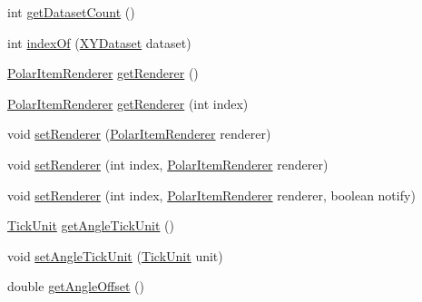 \begin{DoxyCompactItemize}
\item 
int \mbox{\hyperlink{classorg_1_1jfree_1_1chart_1_1plot_1_1_polar_plot_a02749336dcc9281dc6bd2af61145f5af}{get\+Dataset\+Count}} ()
\item 
int \mbox{\hyperlink{classorg_1_1jfree_1_1chart_1_1plot_1_1_polar_plot_ad76d83b6179eed10de0c216bbbd6437e}{index\+Of}} (\mbox{\hyperlink{interfaceorg_1_1jfree_1_1data_1_1xy_1_1_x_y_dataset}{X\+Y\+Dataset}} dataset)
\item 
\mbox{\hyperlink{interfaceorg_1_1jfree_1_1chart_1_1renderer_1_1_polar_item_renderer}{Polar\+Item\+Renderer}} \mbox{\hyperlink{classorg_1_1jfree_1_1chart_1_1plot_1_1_polar_plot_a49334753a560393d54d2d988577bd23c}{get\+Renderer}} ()
\item 
\mbox{\hyperlink{interfaceorg_1_1jfree_1_1chart_1_1renderer_1_1_polar_item_renderer}{Polar\+Item\+Renderer}} \mbox{\hyperlink{classorg_1_1jfree_1_1chart_1_1plot_1_1_polar_plot_afad236333ed9dff60408dc1827779646}{get\+Renderer}} (int index)
\item 
void \mbox{\hyperlink{classorg_1_1jfree_1_1chart_1_1plot_1_1_polar_plot_a0f5968ac9a7b8c8bff650d6e50881135}{set\+Renderer}} (\mbox{\hyperlink{interfaceorg_1_1jfree_1_1chart_1_1renderer_1_1_polar_item_renderer}{Polar\+Item\+Renderer}} renderer)
\item 
void \mbox{\hyperlink{classorg_1_1jfree_1_1chart_1_1plot_1_1_polar_plot_a3385d278068d3cf8773bda485a7ddb68}{set\+Renderer}} (int index, \mbox{\hyperlink{interfaceorg_1_1jfree_1_1chart_1_1renderer_1_1_polar_item_renderer}{Polar\+Item\+Renderer}} renderer)
\item 
void \mbox{\hyperlink{classorg_1_1jfree_1_1chart_1_1plot_1_1_polar_plot_a6e02f16d0266c4d0a68538564712c76a}{set\+Renderer}} (int index, \mbox{\hyperlink{interfaceorg_1_1jfree_1_1chart_1_1renderer_1_1_polar_item_renderer}{Polar\+Item\+Renderer}} renderer, boolean notify)
\item 
\mbox{\hyperlink{classorg_1_1jfree_1_1chart_1_1axis_1_1_tick_unit}{Tick\+Unit}} \mbox{\hyperlink{classorg_1_1jfree_1_1chart_1_1plot_1_1_polar_plot_ac1d209b7e5ba1bb53c529f7bdb59b501}{get\+Angle\+Tick\+Unit}} ()
\item 
void \mbox{\hyperlink{classorg_1_1jfree_1_1chart_1_1plot_1_1_polar_plot_adc9661a3cd1aa24c986f5e4fdadd6e3a}{set\+Angle\+Tick\+Unit}} (\mbox{\hyperlink{classorg_1_1jfree_1_1chart_1_1axis_1_1_tick_unit}{Tick\+Unit}} unit)
\item 
double \mbox{\hyperlink{classorg_1_1jfree_1_1chart_1_1plot_1_1_polar_plot_abb7d874d8406ec1fe25a27d5ead0cd34}{get\+Angle\+Offset}} ()

\end{DoxyCompactItemize}

